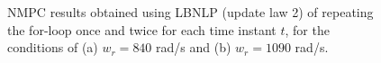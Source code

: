 \documentclass[journal]{IEEEtranTIE}
\newcommand{\KYCH}[1]{{\color{blue} [KC: #1]}} %
\begin{document}
\begin{figure}[!t]
\centering
{}
\vfill
{}
\caption{NMPC results obtained using LBNLP (update law 2) of repeating the for-loop once and twice for each time instant $t$, for the conditions of (a) $w_r = 840$ rad/s  and (b) $w_r = 1090$ rad/s.
}\label{Fig_LBNLP}
\end{figure}


\end{document}
